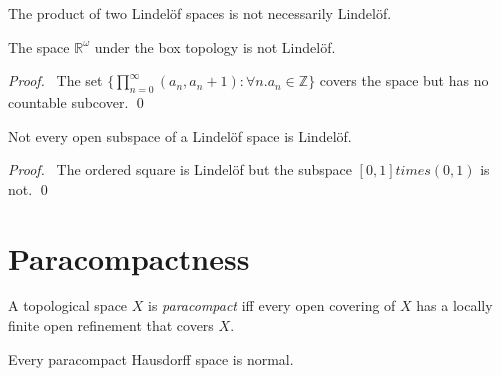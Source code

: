 \begin{cor}
The product of two Lindel\"{o}f spaces is not necessarily Lindel\"{o}f.
\end{cor}

\begin{prop}
The space $\mathbb{R}^\omega$ under the box topology is not Lindel\"{o}f.
\end{prop}

\begin{proof}
\pf\ The set $\{ \prod_{n=0}^\infty (a_n, a_n + 1) : \forall n. a_n \in \mathbb{Z} \}$ covers the space but has no countable subcover. \qed
\end{proof}

\begin{prop}
Not every open subspace of a Lindel\"{o}f space is Lindel\"{o}f.
\end{prop}

\begin{proof}
\pf\ The ordered square is Lindel\"{o}f but the subspace $[0,1]
times (0,1)$ is not. \qed
\end{proof}

\section{Paracompactness}

\begin{df}[Paracompact]
A topological space $X$ is \emph{paracompact} iff every open covering of $X$ has a locally finite open refinement that covers $X$.
\end{df}

\begin{thm}
\label{thm:topology:paracompact:Hausdorff_normal}
Every paracompact Hausdorff space is normal.
\end{thm}

